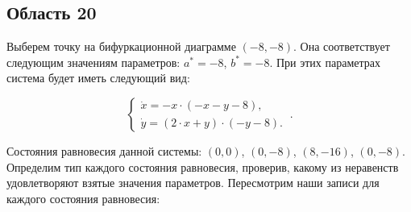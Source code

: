 \subsection{Область 20}

Выберем точку на бифуркационной диаграмме $(-8, -8)$. Она соответствует следующим значениям параметров:  $a^\ast = -8$, $b^\ast = -8$. При этих параметрах система будет иметь следующий вид: 

$$
\left \lbrace 
\begin{matrix} 
	\dot{x} = -x \cdot (-x - y - 8), \\
	\dot{y} = (2 \cdot x + y) \cdot (-y - 8). \
\end{matrix} 
\right . .$$

Состояния равновесия данной системы: $(0, 0)$, $(0, -8)$, $(8, -16)$, $(0, -8)$. Определим тип каждого состояния равновесия, проверив, какому из неравенств удовлетворяют взятые значения параметров.  Пересмотрим наши записи для каждого состояния равновесия: 

